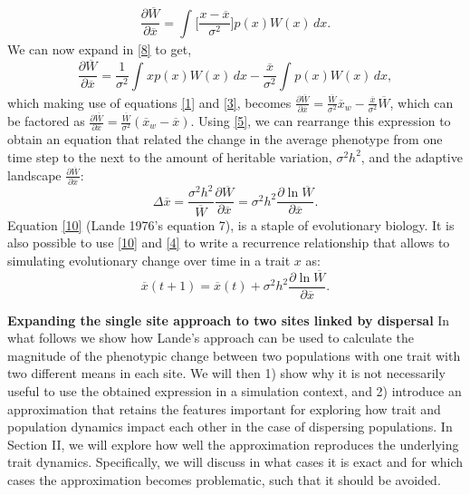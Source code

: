 \documentclass{revtex4}
\begin{document}
\begin{equation}\label{8}
\frac{\partial \overline{W}}{\partial \overline{x}}=\int_{} \Big[\frac{x-\overline{x}}{\sigma^{2}}\Big] p(x)W(x)\,dx.
\end{equation}
We can now expand in \ref{8} to get,
\begin{equation}\label{9}
\frac{\partial \overline{W}}{\partial \overline{x}}=
\frac{1}{\sigma^{2}}\int_{}xp(x)W(x)\,dx-\frac{\overline{x}}{\sigma^{2}}\int_{}p(x)W(x)\,dx,
\end{equation}
which making use of equations \ref{1} and \ref{3}, becomes $\frac{\partial \overline{W}}{\partial \overline{x}}=
\frac{\overline{W}}{\sigma^{2}}\overline{x}_{w}-\frac{\overline{x}}{\sigma^{2}}\overline{W}$, which can be factored as $\frac{\partial \overline{W}}{\partial \overline{x}}=
\frac{\overline{W}}{\sigma^{2}}(\overline{x}_{w}-\overline{x})$. Using \ref{5}, we can rearrange this expression to obtain an equation that related the change in the average phenotype from one time step to the next to the amount of heritable variation, $\sigma^{2}h^{2}$, and the adaptive landscape $\frac{\partial \overline{W}}{\partial \overline{x}}$:
\begin{equation}\label{10}
\Delta \overline{x}=\frac{\sigma^{2}h^{2}}{\overline{W}}\frac{\partial \overline{W}}{\partial \overline{x}}=\sigma^{2}h^{2}\frac{\partial \ln\overline{W}}{\partial \overline{x}}.
\end{equation}
Equation \ref{10} (Lande 1976's equation 7), is a staple of evolutionary biology. It is also possible to use \ref{10} and \ref{4} to write a recurrence relationship that allows to simulating evolutionary change over time in a trait $x$ as:
\begin{equation}\label{11}
\overline{x}(t+1)=\overline{x}(t)+\sigma^{2}h^{2}\frac{\partial \ln\overline{W}}{\partial \overline{x}}.
\end{equation}

\textbf{Expanding the single site approach to two sites linked by dispersal} In what follows we show how Lande's approach can be used to calculate the magnitude of the phenotypic change between two populations with one trait with two different means in each site.
We will then 1) show why it is not necessarily useful to use the obtained expression in a simulation context, and 2) introduce an approximation that retains the features important for exploring how trait and population dynamics impact each other in the case of dispersing populations. In Section II, we will explore how well the approximation reproduces the underlying trait dynamics.
Specifically, we will discuss in what cases it is exact and for which cases the approximation becomes problematic, such that it should be avoided.
\end{document}
